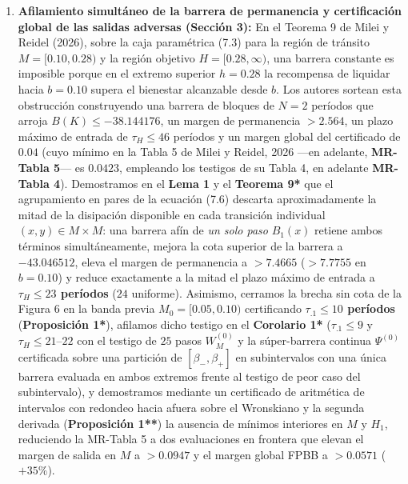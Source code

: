 \documentclass[11pt,letterpaper]{article}
\theoremstyle{plain}
\begin{document}
\begin{enumerate}
\item \textbf{Afilamiento simultáneo de la barrera de permanencia y certificación global de las salidas adversas (Sección 3):} En el Teorema 9 de Milei y Reidel (2026), sobre la caja paramétrica (7.3) para la región de tránsito $M=[0.10,0.28)$ y la región objetivo $H=[0.28,\infty)$, una barrera constante es imposible porque en el extremo superior $h=0.28$ la recompensa de liquidar hacia $b=0.10$ supera el bienestar alcanzable desde $b$. Los autores sortean esta obstrucción construyendo una barrera de bloques de $N=2$ períodos que arroja $B(K)\le -38.144176$, un margen de permanencia $>2.564$, un plazo máximo de entrada de $\tau_H\le 46$ períodos y un margen global del certificado de $0.04$ (cuyo mínimo en la Tabla 5 de Milei y Reidel, 2026 ---en adelante, \textbf{MR-Tabla 5}--- es $0.0423$, empleando los testigos de su Tabla 4, en adelante \textbf{MR-Tabla 4}). Demostramos en el \textbf{Lema 1} y el \textbf{Teorema 9*} que el agrupamiento en pares de la ecuación (7.6) descarta aproximadamente la mitad de la disipación disponible en cada transición individual $(x,y)\in M\times M$: una barrera afín de \emph{un solo paso} $B_1(x)$ retiene ambos términos simultáneamente, mejora la cota superior de la barrera a $-43.046512$, eleva el margen de permanencia a \textbf{$>7.4665$} ($>7.7755$ en $b=0.10$) y reduce exactamente a la mitad el plazo máximo de entrada a \textbf{$\tau_H\le 23$ períodos} ($24$ uniforme). Asimismo, cerramos la brecha sin cota de la Figura 6 en la banda previa $M_0=[0.05,0.10)$ certificando \textbf{$\tau_{.1}\le 10$ períodos} (\textbf{Proposición 1*}), afilamos dicho testigo en el \textbf{Corolario 1*} ($\tau_{.1}\le 9$ y $\tau_H\le 21$--$22$ con el testigo de $25$ pasos $W_M^{(0)}$ y la súper-barrera continua $\Psi^{(0)}$ certificada sobre una partición de $[\beta_-,\beta_+]$ en subintervalos con una única barrera evaluada en ambos extremos frente al testigo de peor caso del subintervalo), y demostramos mediante un certificado de aritmética de intervalos con redondeo hacia afuera sobre el Wronskiano y la segunda derivada (\textbf{Proposición 1**}) la ausencia de mínimos interiores en $M$ y $H_1$, reduciendo la MR-Tabla 5 a dos evaluaciones en frontera que elevan el margen de salida en $M$ a $>0.0947$ y el margen global FPBB a \textbf{$>0.0571$} ($+35\%$).


\end{enumerate}
\end{document}
